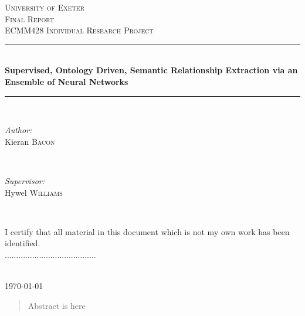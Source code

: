 \documentclass[11pt]{article} %
\newcommand{\HRule}{\rule{\linewidth}{0.5mm}} %
\begin{document}

\begin{titlepage}

\center %

\textsc{\LARGE University of Exeter}\\[1.0cm] %
\textsc{\Large Final Report}\\[0.5cm] %
\textsc{\large ECMM428 Individual Research Project}\\[0.5cm] %

\HRule \\[0.4cm]
{ \huge \bfseries Supervised, Ontology Driven, Semantic Relationship Extraction via an Ensemble of Neural Networks}\\[0.4cm] %
\HRule \\[1.5cm]

\begin{minipage}{0.4\textwidth}
\begin{flushleft} \large
\emph{Author:}\\
Kieran \textsc{Bacon}%
\end{flushleft}
\end{minipage}
~
\begin{minipage}{0.4\textwidth}
\begin{flushright} \large
\emph{Supervisor:} \\
Hywel \textsc{Williams} %
\end{flushright}
\end{minipage}\\[3cm]

\begin{minipage}{0.8\textwidth}
\centering
I certify that all material in this document which is not my own work has been identified.\\

\vspace{1cm}
........................................

\end{minipage}\\[2cm]


{\large \today}\\[3cm] %

\begin{abstract}
\noindent Abstract is here 
\end{abstract}


\vfill %
\end{titlepage}
\end{document}
